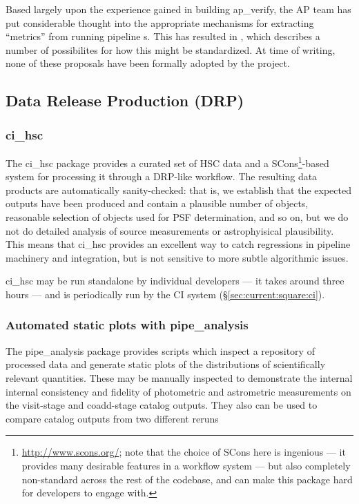 \documentclass[DM,authoryear,toc,lsstdraft]{lsstdoc}
\begin{document}
Based largely upon the experience gained in building ap\_verify, the AP team
has put considerable thought into the appropriate mechanisms for extracting
``metrics'' from running pipeline s. This has resulted in
, which describes a number of possibilites for how this might
be standardized. At time of writing, none of these proposals have been
formally adopted by the project.

\subsection{Data Release Production (DRP)}
\label{sec:current:drp}

\subsubsection{ci\_hsc}
\label{sec:current:drp:cihsc}

The ci\_hsc package provides a curated set of HSC data and a
SCons\footnote{\url{http://www.scons.org/}; note that the choice of SCons here
is ingenious --- it provides many desirable features in a workflow system ---
but also completely non-standard across the rest of the codebase, and can make
this package hard for developers to engage with.}-based system for processing
it through a DRP-like workflow. The resulting data products are automatically
sanity-checked: that is, we establish that the expected outputs have been
produced and contain a plausible number of objects, reasonable selection of
objects used for PSF determination, and so on, but we do not do detailed
analysis of source measurements or astrophyisical plausibility. This means
that ci\_hsc provides an excellent way to catch regressions in pipeline
machinery and integration, but is not sensitive to more subtle algorithmic
issues.

ci\_hsc may be run standalone by individual developers --- it takes around
three hours --- and is periodically run by the CI system
(\S\ref{sec:current:square:ci}).

\subsubsection{Automated static plots with pipe\_analysis}
\label{sec:current:drp:pipeanalysis}

The pipe\_analysis package provides scripts which inspect a repository of
processed data and generate static plots of the distributions of
scientifically relevant quantities. These may be manually inspected to
demonstrate the internal internal consistency and fidelity of photometric and
astrometric measurements on the visit-stage and coadd-stage catalog outputs.
They also can be used to compare catalog outputs from two different reruns
\end{document}
